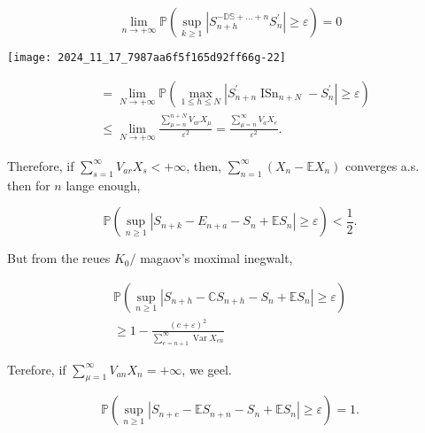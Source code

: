 \documentclass[11pt]{amsbook}
\theoremstyle{plain}%
\theoremstyle{definition}
\theoremstyle{remark}
\begin{document}
$$
\lim _{n \rightarrow+\infty} \mathbb{P}\left(\sup _{k \geqslant 1}\left|S_{n+h}^{-\mathbb{D S}+\ldots+n} S_{n}^{\prime}\right| \geqslant \varepsilon\right)=0
$$

\begin{center}
\texttt{[image: 2024\_11\_17\_7987aa6f5f165d92ff66g-22]}
\end{center}

$$
\begin{aligned}
& =\lim _{N \rightarrow+\infty} \mathbb{P}\left(\max _{1 \leq h \leq N}\left|S_{n+n}^{\prime} \operatorname{ISn}_{n+N}-S_{n}^{\prime}\right| \geqslant \varepsilon\right) \\
& \leq \lim _{N \rightarrow+\infty} \frac{\sum_{\mu=n}^{n+N} V_{a r} X_{\mu}}{\varepsilon^{2}}=\frac{\sum_{\mu=n}^{\infty} V_{a} X_{e}}{\varepsilon^{2}} \text {. }
\end{aligned}
$$

Therefore, if $\sum_{s=1}^{\infty} V_{a r} X_{s}<+\infty$, then, $\sum_{n=1}^{\infty}\left(X_{n}-\mathbb{E} X_{n}\right)$ converges a.s.\\
then for $n$ lange enough,

$$
\mathbb{P}\left(\sup _{n \geqslant 1}\left|S_{n+k}-E_{n+a}-S_{n}+\mathbb{E} S_{n}\right| \geqslant \varepsilon\right)<\frac{1}{2} .
$$

But from the reues $K_{0} /$ magaov's moximal inegwalt,

$$
\begin{gathered}
\mathbb{P}\left(\sup _{n \geqslant 1}\left|S_{n+h}-\mathbb{C} S_{n+h}-S_{n}+\mathbb{E} S_{n}\right| \geqslant \varepsilon\right) \\
\geqslant 1-\frac{(c+\varepsilon)^{2}}{\sum_{e=n+1}^{\infty} \operatorname{Var} X_{e n}}
\end{gathered}
$$

Terefore, if $\sum_{\mu=1}^{\infty} V_{a n} X_{n}=+\infty$, we geel.

$$
\mathbb{P}\left(\sup _{n \geqslant 1}\left|S_{n+e}-\mathbb{E} S_{n+n}-S_{n}+\mathbb{E} S_{n}\right| \geqslant \varepsilon\right)=1 .
$$
\end{document}
